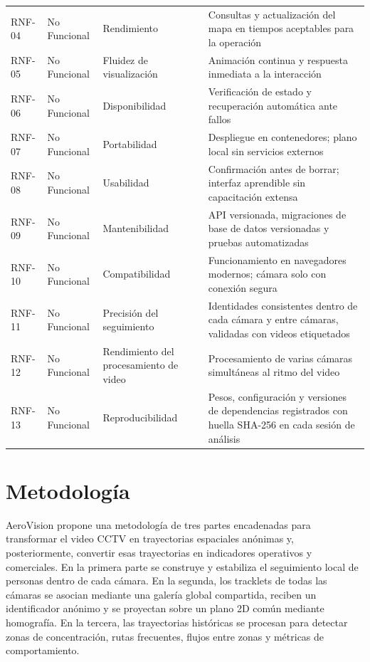 \documentclass[12pt,letterpaper]{article}
\begin{document}
\begin{table}[!ht]
\begin{tabular}{p{1cm}p{2.2cm}p{6cm}p{7.5cm}}
RNF-04 & No Funcional & Rendimiento & Consultas y actualización del mapa en tiempos aceptables para la operación \\
RNF-05 & No Funcional & Fluidez de visualización & Animación continua y respuesta inmediata a la interacción \\
RNF-06 & No Funcional & Disponibilidad & Verificación de estado y recuperación automática ante fallos \\
RNF-07 & No Funcional & Portabilidad & Despliegue en contenedores; plano local sin servicios externos \\
RNF-08 & No Funcional & Usabilidad & Confirmación antes de borrar; interfaz aprendible sin capacitación extensa \\
RNF-09 & No Funcional & Mantenibilidad & API versionada, migraciones de base de datos versionadas y pruebas automatizadas \\
RNF-10 & No Funcional & Compatibilidad & Funcionamiento en navegadores modernos; cámara solo con conexión segura \\
RNF-11 & No Funcional & Precisión del seguimiento & Identidades consistentes dentro de cada cámara y entre cámaras, validadas con videos etiquetados \\
RNF-12 & No Funcional & Rendimiento del procesamiento de video & Procesamiento de varias cámaras simultáneas al ritmo del video \\
RNF-13 & No Funcional & Reproducibilidad & Pesos, configuración y versiones de dependencias registrados con huella SHA-256 en cada sesión de análisis \\
\hline
\end{tabular}
\end{table}

\FloatBarrier


\section{Metodología}

AeroVision propone una metodología de tres partes encadenadas para
transformar el video CCTV en trayectorias espaciales anónimas y,
posteriormente, convertir esas trayectorias en indicadores operativos y
comerciales. En la primera parte se construye y estabiliza el seguimiento
local de personas dentro de cada cámara. En la segunda, los tracklets de
todas las cámaras se asocian mediante una galería global compartida,
reciben un identificador anónimo y se proyectan sobre un plano 2D común
mediante homografía. En la tercera, las trayectorias históricas se
procesan para detectar zonas de concentración, rutas frecuentes, flujos
entre zonas y métricas de comportamiento.
\end{document}
